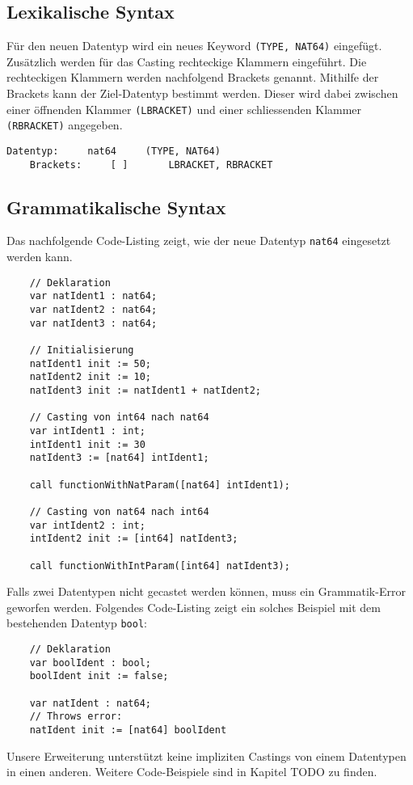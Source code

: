 \documentclass[10pt, a4paper, twocolumn]{article} %
\begin{document}
\subsection{Lexikalische Syntax}
Für den neuen Datentyp wird ein neues Keyword \texttt{(TYPE, NAT64)} eingefügt.
Zusätzlich werden für das Casting rechteckige Klammern eingeführt.
Die rechteckigen Klammern werden nachfolgend Brackets genannt.
Mithilfe der Brackets kann der Ziel-Datentyp bestimmt werden.
Dieser wird dabei zwischen einer öffnenden Klammer \texttt{(LBRACKET)} und einer schliessenden Klammer \texttt{(RBRACKET)} angegeben.
\begin{lstlisting}[backgroundcolor = \color{lightgray},
xleftmargin = 0.05cm,
framexleftmargin = 0.05em]
    Datentyp:     nat64     (TYPE, NAT64)
    Brackets:     [ ]       LBRACKET, RBRACKET
\end{lstlisting}

\subsection{Grammatikalische Syntax}
Das nachfolgende Code-Listing zeigt, wie der neue Datentyp \texttt{nat64} eingesetzt werden kann.
\begin{lstlisting}
    // Deklaration
    var natIdent1 : nat64;
    var natIdent2 : nat64;
    var natIdent3 : nat64;

    // Initialisierung
    natIdent1 init := 50;
    natIdent2 init := 10;
    natIdent3 init := natIdent1 + natIdent2;

    // Casting von int64 nach nat64
    var intIdent1 : int;
    intIdent1 init := 30
    natIdent3 := [nat64] intIdent1;

    call functionWithNatParam([nat64] intIdent1);

    // Casting von nat64 nach int64
    var intIdent2 : int;
    intIdent2 init := [int64] natIdent3;

    call functionWithIntParam([int64] natIdent3);
\end{lstlisting}
Falls zwei Datentypen nicht gecastet werden können, muss ein Grammatik-Error geworfen werden.
Folgendes Code-Listing zeigt ein solches Beispiel mit dem bestehenden Datentyp \texttt{bool}:
\begin{lstlisting}
    // Deklaration
    var boolIdent : bool;
    boolIdent init := false;

    var natIdent : nat64;
    // Throws error:
    natIdent init := [nat64] boolIdent
\end{lstlisting}
Unsere Erweiterung unterstützt keine impliziten Castings von einem Datentypen in einen anderen.
Weitere Code-Beispiele sind in Kapitel TODO zu finden.
\end{document}
